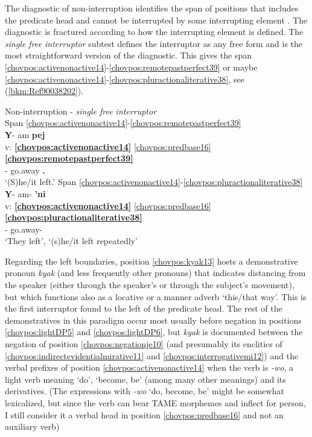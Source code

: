 \documentclass[output=paper]{langscibook}
\begin{document}
The diagnostic of non-interruption identifies the span of positions that includes the predicate head and cannot be interrupted by some interrupting element \citep{Tallman2021}. The diagnostic is fractured according to how the interrupting element is defined. The \textit{single free interruptor} subtest defines the interruptor as any free form and is the most straightforward version of the diagnostic. This gives the span \ref{chovpos:activenonactive14}{}-\ref{chovpos:remotepastperfect39} or maybe \ref{chovpos:activenonactive14}{}-\ref{chovpos:pluractionaliterative38}, see (\ref{bkm:Ref90038202}).

\ea\label{bkm:Ref90038202} Non-interruption - \textit{single free interruptor} \\
    \ea  Span \ref{chovpos:activenonactive14}{}-\ref{chovpos:remotepastperfect39}\\ {
    \glll {} \textbf{Y}{}- am \textbf{pej}\\
    v: \textbf{\ref{chovpos:activenonactive14}} \ref{chovpos:predbase16} \textbf{\ref{chovpos:remotepastperfect39}} \\ 
    {} \textbf{\Third}- go.away \textbf{\Rem.\Pst{}} \\ 
    \glt `(S)he/it left.'
    }
    \ex  Span \ref{chovpos:activenonactive14}{}-\ref{chovpos:pluractionaliterative38}\\ {
    \glll {} \textbf{Y}{}- am- \textbf{'ni}\\
    v: \textbf{\ref{chovpos:activenonactive14}} \ref{chovpos:predbase16} \textbf{\ref{chovpos:pluractionaliterative38}}\\ 
    {} \textbf{\Third}- go.away- \textbf{\Plact{}} \\
    \glt `They left', `(s)he/it left repeatedly'
    }
    \z 
\z 

Regarding the left boundaries, position \ref{chovpos:kyak13} hosts a demonstrative pronoun \textit{kyak} (and less frequently other pronouns) that indicates distancing from the speaker (either through the speaker's or through the subject's movement), but which functions also as a locative or a manner adverb `this/that way'. This is the first interruptor found to the left of the predicate head. The rest of the demonstratives in this paradigm occur most usually before negation in positions \ref{chovpos:lightDP5} and \ref{chovpos:lightDP6}, but \textit{kyak} is documented between the negation of position \ref{chovpos:negationje10} (and presumably its enclitics of \ref{chovpos:indirectevidentialmirative11} and \ref{chovpos:interrogativemi12}) and the verbal prefixes of position \ref{chovpos:activenonactive14} when the verb is \textit{-wo}, a light verb meaning `do', `become, be' (among many other meanings) and its derivatives. (The expressions with \textit{-wo} `do, become, be' might be somewhat lexicalized, but since the verb can bear TAME morphemes and inflect for person, I still consider it a verbal head in position \ref{chovpos:predbase16} and not an auxiliary verb)
\end{document}
